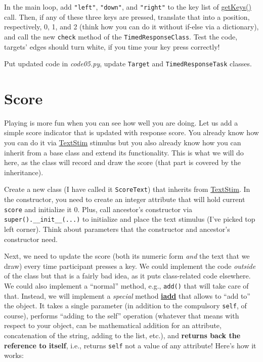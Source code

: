 \documentclass[
]{book}
\begin{document}
In the main loop, add \texttt{"left"}, \texttt{"down"}, and \texttt{"right"} to the key list of \href{https://psychopy.org/api/event.html\#psychopy.event.getKeys}{getKeys()} call. Then, if any of these three keys are pressed, translate that into a position, respectively, 0, 1, and 2 (think how you can do it without if-else via a dictionary), and call the new \texttt{check} method of the \texttt{TimedResponseClass}. Test the code, targets' edges should turn white, if you time your key press correctly!

Put updated code in \emph{code05.py}, update \texttt{Target} and \texttt{TimedResponseTask} classes.

\hypertarget{score}{%
\section{Score}\label{score}}

Playing is more fun when you can see how well you are doing. Let us add a simple score indicator that is updated with response score. You already know how you can do it via \href{https://psychopy.org/api/visual/textstim.html\#psychopy.visual.TextStim}{TextStim} stimulus but you also already know how you can inherit from a base class and extend its functionality. This is what we will do here, as the class will record and draw the score (that part is covered by the inheritance).

Create a new class (I have called it \texttt{ScoreText}) that inherits from \href{https://psychopy.org/api/visual/textstim.html\#psychopy.visual.TextStim}{TextStim}. In the constructor, you need to create an integer attribute that will hold current \texttt{score} and initialize it 0. Plus, call ancestor's constructor via \texttt{super().\_\_init\_\_(...)} to initialize and place the text stimulus (I've picked top left corner). Think about parameters that the constructor and ancestor's constructor need.

Next, we need to update the score (both its numeric form \emph{and} the text that we draw) every time participant presses a key. We could implement the code \emph{outside} of the class but that is a fairly bad idea, as it puts class-related code elsewhere. We could also implement a ``normal'' method, e.g., \texttt{add()} that will take care of that. Instead, we will implement a \emph{special} method \href{https://docs.python.org/3/reference/datamodel.html\#object.__iadd__}{\textbf{iadd}} that allows to ``add to'' the object. It takes a single parameter (in addition to the compulsory \texttt{self}, of course), performs ``adding to the self'' operation (whatever that means with respect to your object, can be mathematical addition for an attribute, concatenation of the string, adding to the list, etc.), and \textbf{returns back the reference to itself}, i.e., returns \texttt{self} not a value of any attribute! Here's how it works:
\end{document}
